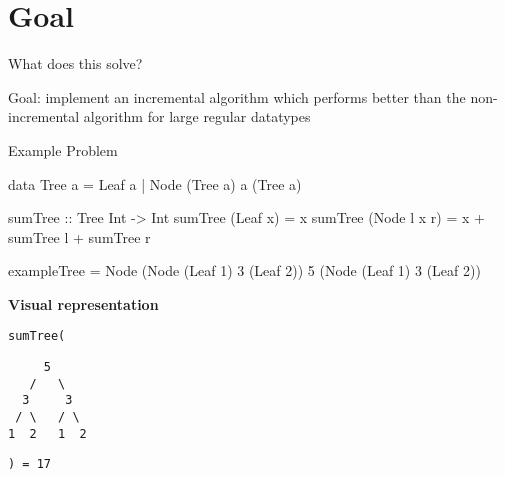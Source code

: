 \section{Goal}

\begin{slide}{What does this solve?}

Goal: implement an incremental algorithm which performs better than the non-incremental algorithm for large regular datatypes

\end{slide}


\begin{slide}{Example Problem}
\begin{haskell}
data Tree a = Leaf a | Node (Tree a) a (Tree a)

sumTree :: Tree Int -> Int
sumTree (Leaf x)     = x
sumTree (Node l x r) = x + sumTree l + sumTree r

exampleTree = Node (Node (Leaf 1) 3 (Leaf 2)) 5 (Node (Leaf 1) 3 (Leaf 2))
\end{haskell}

\begin{center}
\textbf{Visual representation}

\begin{minipage}{.1\textwidth}
\texttt{sumTree(}
\end{minipage}
\begin{minipage}{.2\textwidth}
\begin{center}
\begin{verbatim}
     5 
   /   \
  3     3
 / \   / \
1  2   1  2
\end{verbatim}
\end{center}
\end{minipage}
\begin{minipage}{.1\textwidth}
\texttt{) = 17}
\end{minipage}
\end{center}
\end{slide}



